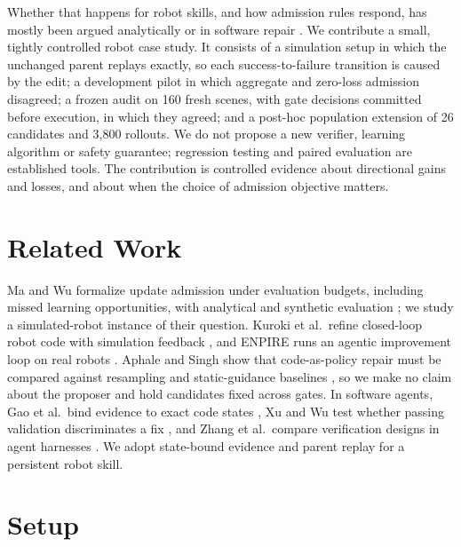 \documentclass[letterpaper]{article} %
\begin{document}
Whether that happens for robot skills, and how admission rules respond, has mostly been argued analytically or in software repair \citep{ma2026validation,gao2026looping}. We contribute a small, tightly controlled robot case study. It consists of a simulation setup in which the unchanged parent replays exactly, so each success-to-failure transition is caused by the edit; a development pilot in which aggregate and zero-loss admission disagreed; a frozen audit on 160 fresh scenes, with gate decisions committed before execution, in which they agreed; and a post-hoc population extension of 26 candidates and 3{,}800 rollouts. We do not propose a new verifier, learning algorithm or safety guarantee; regression testing and paired evaluation are established tools. The contribution is controlled evidence about directional gains and losses, and about when the choice of admission objective matters.

\section{Related Work}
Ma and Wu formalize update admission under evaluation budgets, including missed learning opportunities, with analytical and synthetic evaluation \citep{ma2026validation}; we study a simulated-robot instance of their question. Kuroki et al.\ refine closed-loop robot code with simulation feedback \citep{kuroki2026closedloop}, and ENPIRE runs an agentic improvement loop on real robots \citep{xiao2026enpire}. Aphale and Singh show that code-as-policy repair must be compared against resampling and static-guidance baselines \citep{aphale2026selfrepair}, so we make no claim about the proposer and hold candidates fixed across gates. In software agents, Gao et al.\ bind evidence to exact code states \citep{gao2026looping}, Xu and Wu test whether passing validation discriminates a fix \citep{xu2026evidence}, and Zhang et al.\ compare verification designs in agent harnesses \citep{zhang2026verification}. We adopt state-bound evidence and parent replay for a persistent robot skill.

\section{Setup}
\end{document}
